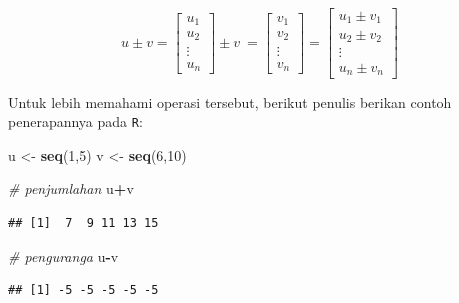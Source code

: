 \documentclass[]{book}
\newenvironment{Shaded}{\begin{snugshade}}{\end{snugshade}}
\newcommand{\CommentTok}[1]{\textcolor[rgb]{0.56,0.35,0.01}{\textit{#1}}}
\newcommand{\DecValTok}[1]{\textcolor[rgb]{0.00,0.00,0.81}{#1}}
\newcommand{\KeywordTok}[1]{\textcolor[rgb]{0.13,0.29,0.53}{\textbf{#1}}}
\newcommand{\NormalTok}[1]{#1}
\newcommand{\OperatorTok}[1]{\textcolor[rgb]{0.81,0.36,0.00}{\textbf{#1}}}
\newcommand{\StringTok}[1]{\textcolor[rgb]{0.31,0.60,0.02}{#1}}
\theoremstyle{definition}
\theoremstyle{definition}
\theoremstyle{definition}
\theoremstyle{remark}
\begin{document}
\begin{equation}
u \pm v = \begin{bmatrix}
      u_1            \\[0.3em]
      u_2            \\[0.3em]
      \vdots         \\[0.3em] 
      u_n
     \end{bmatrix}
\pm v\ = \begin{bmatrix}
      v_1            \\[0.3em]
      v_2            \\[0.3em]
      \vdots         \\[0.3em] 
      v_n
     \end{bmatrix}
= \begin{bmatrix}
      u_1 \pm v_1            \\[0.3em]
      u_2 \pm v_2           \\[0.3em]
      \vdots         \\[0.3em] 
      u_n \pm v_n
     \end{bmatrix}
     \label{eq:addvector2}
\end{equation}

Untuk lebih memahami operasi tersebut, berikut penulis berikan contoh penerapannya pada \texttt{R}:

\begin{Shaded}
\begin{Highlighting}[]
\NormalTok{u <-}\StringTok{ }\KeywordTok{seq}\NormalTok{(}\DecValTok{1}\NormalTok{,}\DecValTok{5}\NormalTok{)}
\NormalTok{v <-}\StringTok{ }\KeywordTok{seq}\NormalTok{(}\DecValTok{6}\NormalTok{,}\DecValTok{10}\NormalTok{)}

\CommentTok{# penjumlahan}
\NormalTok{u}\OperatorTok{+}\NormalTok{v}
\end{Highlighting}
\end{Shaded}

\begin{verbatim}
## [1]  7  9 11 13 15
\end{verbatim}

\begin{Shaded}
\begin{Highlighting}[]
\CommentTok{# penguranga}
\NormalTok{u}\OperatorTok{-}\NormalTok{v}
\end{Highlighting}
\end{Shaded}

\begin{verbatim}
## [1] -5 -5 -5 -5 -5
\end{verbatim}
\end{document}

